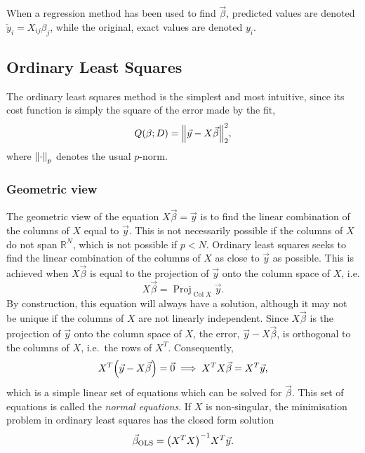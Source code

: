 \documentclass[11pt,british,a4paper]{article}
\DeclareMathOperator{\Proj}{Proj}
\DeclareMathOperator{\Col}{Col}
\numberwithin{equation}{section}
\begin{document}
When a regression method has been used to find \(\vec{\beta}\), predicted values are denoted \(\tilde{y}_i = X_{ij}\beta_j\), while the original, exact values are denoted \(y_i\).

\subsection{Ordinary Least Squares}
The ordinary least squares method is the simplest and most intuitive, since its cost function is simply the square of the error made by the fit,
\begin{equation}
    Q(\beta;D) = \norm{\vec{y}-X\vec{\beta}}_2^2,
\end{equation}
where \(\norm{\cdot}_p\) denotes the usual \(p\)-norm.

\subsubsection{Geometric view}
The geometric view of the equation \(X\vec{\beta}=\vec{y}\) is to find the linear combination of the columns of \(X\) equal to \(\vec{y}\).
This is not necessarily possible if the columns of \(X\) do not span \(\mathbb{R}^N\), which is not possible if \(p<N\).
Ordinary least squares seeks to find the linear combination of the columns of \(X\) as close to \(\vec{y}\) as possible.
This is achieved when \(X\vec{\beta}\) is equal to the projection of \(\vec{y}\) onto the column space of \(X\), i.e.
\begin{equation}
    X\vec{\beta} = \Proj_{\Col{X}}{\vec{y}}.
\end{equation}
By construction, this equation will always have a solution, although it may not be unique if the columns of \(X\) are not linearly independent.
Since \(X\vec{\beta}\) is the projection of \(\vec{y}\) onto the column space of \(X\), the error, \(\vec{y}-X\vec{\beta}\), is orthogonal to the columns of \(X\), i.e.\ the rows of \(X^T\).
Consequently,
\begin{equation}
    X^T\qty(\vec{y}-X\vec{\beta}) = \vec{0}
    \implies
    X^T X \vec{\beta} = X^T \vec{y},\label{eq:olsnormal}
\end{equation}
which is a simple linear set of equations which can be solved for \(\vec{\beta}\).
This set of equations is called the \emph{normal equations}.
If \(X\) is non-singular, the minimisation problem in ordinary least squares has the closed form solution
\begin{equation}
    \vec{\beta}_{\text{OLS}} = \qty(X^T X)^{-1} X^T \vec{y}.
\end{equation}
\end{document}
